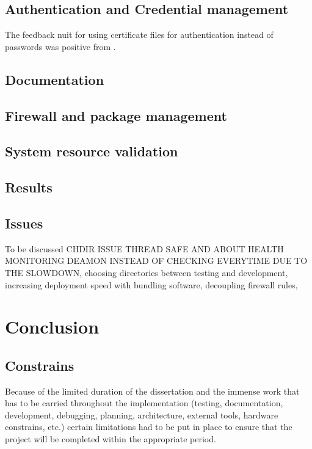 \documentclass{article}
\begin{document}
\subsection{Authentication and Credential management}
The feedback \gls{nuit} for using certificate files for authentication instead of passwords was positive from .

\subsection{Documentation}

\subsection{Firewall and package management}

\subsection{System resource validation}

\subsection{Results}

\subsection{Issues}
{\color{red} 
	To be discussed CHDIR ISSUE THREAD SAFE AND ABOUT HEALTH MONITORING DEAMON INSTEAD OF CHECKING EVERYTIME DUE TO THE SLOWDOWN, choosing directories between testing and development, increasing deployment speed with bundling software, decoupling firewall rules,  
}

\newpage
\section{Conclusion}

\subsection{Constrains}
Because of the limited duration of the dissertation and the immense work that has to be carried throughout the implementation (testing, documentation, development, debugging, planning, architecture, external tools, hardware constrains, etc.) certain limitations had to be put in place to ensure that the project will be completed within the appropriate period.
\end{document}

